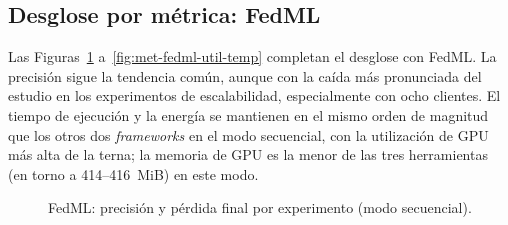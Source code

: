 \subsection{Desglose por métrica: FedML}\label{sec:metricas-fedml}

Las Figuras~\ref{fig:met-fedml-acc-loss} a~\ref{fig:met-fedml-util-temp} completan el desglose con
FedML. La precisión sigue la tendencia común, aunque con la caída más pronunciada del estudio en
los experimentos de escalabilidad, especialmente con ocho clientes. El tiempo de ejecución y la
energía se mantienen en el mismo orden de magnitud que los otros dos \textit{frameworks} en el
modo secuencial, con la utilización de GPU más alta de la terna; la memoria de GPU es la menor de
las tres herramientas (en torno a 414--416~MiB) en este modo.

\begin{figure}[htbp]
  \centering
  \begin{minipage}{0.48\textwidth}
    \centering
  \end{minipage}\hfill
  \begin{minipage}{0.48\textwidth}
    \centering
  \end{minipage}
  \caption{FedML: precisión y pérdida final por experimento (modo secuencial).}
  \label{fig:met-fedml-acc-loss}
\end{figure}

